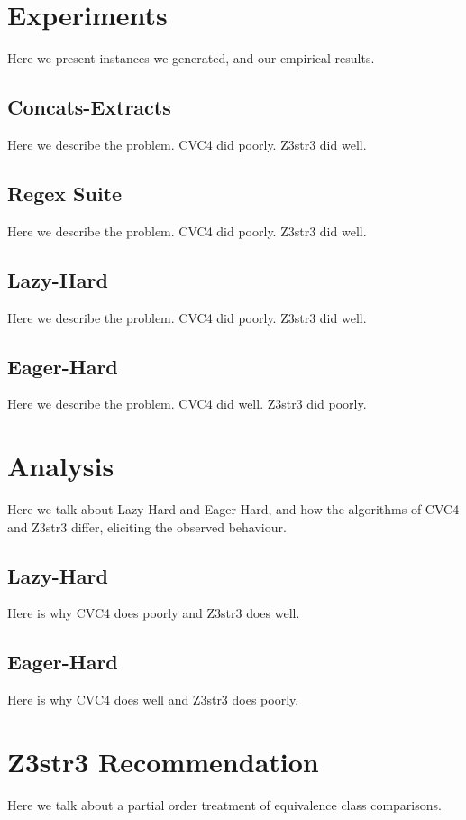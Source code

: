 \section{Experiments}

    Here we present instances we generated, and our empirical results.

    \subsection{Concats-Extracts}

        Here we describe the problem. CVC4 did poorly. Z3str3 did well.

    \subsection{Regex Suite}

        Here we describe the problem. CVC4 did poorly. Z3str3 did well.

    \subsection{Lazy-Hard}

        Here we describe the problem. CVC4 did poorly. Z3str3 did well.

    \subsection{Eager-Hard}

        Here we describe the problem. CVC4 did well. Z3str3 did poorly.

\section{Analysis}

    Here we talk about Lazy-Hard and Eager-Hard, and how the algorithms of CVC4 and Z3str3 differ, eliciting the observed behaviour.

    \subsection{Lazy-Hard}

        Here is why CVC4 does poorly and Z3str3 does well.

    \subsection{Eager-Hard}

        Here is why CVC4 does well and Z3str3 does poorly.

\section{Z3str3 Recommendation}

    Here we talk about a partial order treatment of equivalence class comparisons.
